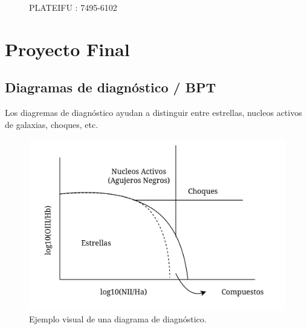 \documentclass[9pt,twocolumn,a4paper]{opticajnl}
\begin{document}
\begin{figure}
    \caption{PLATEIFU : 7495-6102 }
    \label{fig:moreinfo}
\end{figure}

\newpage

\section*{Proyecto Final}
\subsection*{Diagramas de diagnóstico / BPT}
Los diagremas de diagnóstico ayudan a distinguir entre estrellas, nucleos activos de galaxias, choques, etc. 

\begin{figure}
  \begin{center}
    \includegraphics[width=1\linewidth]{./diagrama_ejemplo.png}
  \end{center}
  \caption{Ejemplo visual de una diagrama de diagnóstico.}\label{fig:diagrama_profe.}
\end{figure}
\end{document}
